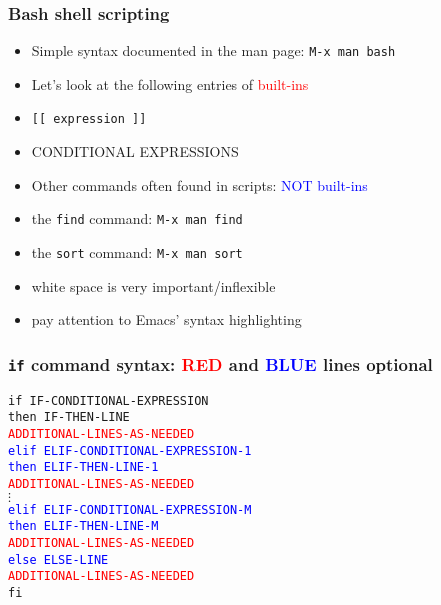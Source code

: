\documentclass[11pt,pdftex,dvipsnames,usenames,helvetica]{beamer}
\begin{document}
\begin{frame}
\frametitle{Bash shell scripting}
\begin{itemize}
\item Simple syntax documented in the man page: {\tt M-x man bash}
\item Let's look at the following entries of \textcolor{red}{built-ins}
\item {\tt [[ expression ]]}
\item CONDITIONAL EXPRESSIONS
\item Other commands often found in scripts: \textcolor{blue}{NOT built-ins} 
\item the {\tt find} command: {\tt M-x man find}
\item the {\tt sort} command: {\tt M-x man sort}
\item white space is very important/inflexible
\item pay attention to Emacs' syntax highlighting 
\end{itemize}
\end{frame}

\begin{frame}
\frametitle{{\tt if} command syntax: \textcolor{red}{RED} and 
\textcolor{blue}{BLUE} lines optional}

{\tt if IF-CONDITIONAL-EXPRESSION\\
then IF-THEN-LINE \\
\textcolor{red}{ADDITIONAL-LINES-AS-NEEDED} \\
\textcolor{blue}{elif ELIF-CONDITIONAL-EXPRESSION-1\\
then ELIF-THEN-LINE-1} \\
\textcolor{red}{ADDITIONAL-LINES-AS-NEEDED}\\
$\vdots$ \\
\textcolor{blue}{elif ELIF-CONDITIONAL-EXPRESSION-M\\
then ELIF-THEN-LINE-M} \\
\textcolor{red}{ADDITIONAL-LINES-AS-NEEDED}\\
\textcolor{blue}{else ELSE-LINE}\\
\textcolor{red}{ADDITIONAL-LINES-AS-NEEDED}\\
fi}

\end{frame}
\end{document}
